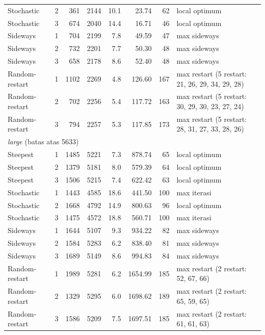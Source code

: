 {\begin{longtable}{l c r r r r r p{3.6cm}}
Stochastic & 2 & 361 & 2144 & 10.1 & 23.74 & 62 & local optimum \\
Stochastic & 3 & 674 & 2040 & 14.4 & 16.71 & 46 & local optimum \\
Sideways & 1 & 704 & 2199 & 7.8 & 49.59 & 47 & max sideways \\
Sideways & 2 & 732 & 2201 & 7.7 & 50.30 & 48 & max sideways \\
Sideways & 3 & 658 & 2178 & 8.6 & 52.40 & 48 & max sideways \\
Random-restart & 1 & 1102 & 2269 & 4.8 & 126.60 & 167 & max restart (5 restart: 21, 26, 29, 34, 29, 28) \\
Random-restart & 2 & 702 & 2256 & 5.4 & 117.72 & 163 & max restart (5 restart: 30, 29, 30, 23, 27, 24) \\
Random-restart & 3 & 794 & 2257 & 5.3 & 117.85 & 173 & max restart (5 restart: 28, 31, 27, 33, 28, 26) \\
\midrule
\multicolumn{8}{l}{\textit{large} (batas atas 5633)} \\
Steepest & 1 & 1485 & 5221 & 7.3 & 878.74 & 65 & local optimum \\
Steepest & 2 & 1379 & 5181 & 8.0 & 579.39 & 64 & local optimum \\
Steepest & 3 & 1506 & 5215 & 7.4 & 622.42 & 63 & local optimum \\
Stochastic & 1 & 1443 & 4585 & 18.6 & 441.50 & 100 & max iterasi \\
Stochastic & 2 & 1668 & 4792 & 14.9 & 800.63 & 96 & local optimum \\
Stochastic & 3 & 1475 & 4572 & 18.8 & 560.71 & 100 & max iterasi \\
Sideways & 1 & 1644 & 5107 & 9.3 & 934.22 & 82 & max sideways \\
Sideways & 2 & 1584 & 5283 & 6.2 & 838.40 & 81 & max sideways \\
Sideways & 3 & 1689 & 5149 & 8.6 & 994.83 & 84 & max sideways \\
Random-restart & 1 & 1989 & 5281 & 6.2 & 1654.99 & 185 & max restart (2 restart: 52, 67, 66) \\
Random-restart & 2 & 1329 & 5295 & 6.0 & 1698.62 & 189 & max restart (2 restart: 65, 59, 65) \\
Random-restart & 3 & 1586 & 5209 & 7.5 & 1697.51 & 185 & max restart (2 restart: 61, 61, 63) \\
\bottomrule
\end{longtable}
}
